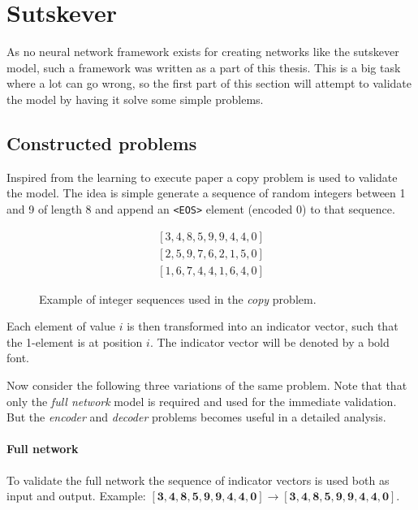 \section{Sutskever}

As no neural network framework exists for creating networks like the sutskever model, such a framework was written as a part of this thesis. This is a big task where a lot can go wrong, so the first part of this section will attempt to validate the model by having it solve some simple problems.

\subsection{Constructed problems}

Inspired from the learning to execute paper \cite{learning-to-execute} a copy problem is used to validate the model. The idea is simple generate a sequence of random integers between 1 and 9 of length 8 and append an \texttt{<EOS>} element (encoded 0) to that sequence. 
\begin{figure}[H]
\begin{equation*}
\begin{aligned}
[3, 4, 8, 5, 9, 9, 4, 4, 0] \\
[2, 5, 9, 7, 6, 2, 1, 5, 0] \\
[1, 6, 7, 4, 4, 1, 6, 4, 0]
\end{aligned}
\end{equation*}
\caption{Example of integer sequences used in the \textit{copy} problem.}
\end{figure}

Each element of value $i$ is then transformed into an indicator vector, such that the 1-element is at position $i$. The indicator vector will be denoted by a bold font.

Now consider the following three variations of the same problem. Note that that only the \textit{full network} model is required and used for the immediate validation. But the \textit{encoder} and \textit{decoder} problems becomes useful in a detailed analysis.

\paragraph{Full network} To validate the full network the sequence of indicator vectors is used both as input and output. Example: $[\mathbf{3}, \mathbf{4}, \mathbf{8}, \mathbf{5}, \mathbf{9}, \mathbf{9}, \mathbf{4}, \mathbf{4}, \mathbf{0}] \rightarrow [\mathbf{3}, \mathbf{4}, \mathbf{8}, \mathbf{5}, \mathbf{9}, \mathbf{9}, \mathbf{4}, \mathbf{4}, \mathbf{0}]$.

